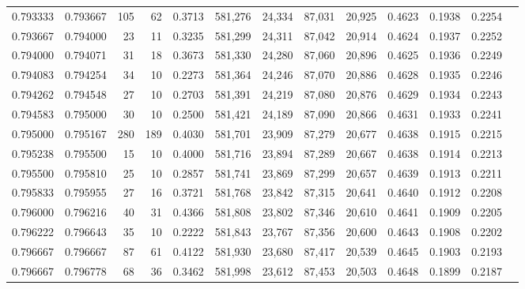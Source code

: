 \begin{tabular}{rrrrrrrrrrrrr}
0.793333 & 0.793667 &   105 &  62 &                                     0.3713 & 581,276 &  24,334 &  87,031 &  20,925 & 0.4623 & 0.1938 & 0.2254 \\
0.793667 & 0.794000 &    23 &  11 &                                     0.3235 & 581,299 &  24,311 &  87,042 &  20,914 & 0.4624 & 0.1937 & 0.2252 \\
0.794000 & 0.794071 &    31 &  18 &                                     0.3673 & 581,330 &  24,280 &  87,060 &  20,896 & 0.4625 & 0.1936 & 0.2249 \\
0.794083 & 0.794254 &    34 &  10 &                                     0.2273 & 581,364 &  24,246 &  87,070 &  20,886 & 0.4628 & 0.1935 & 0.2246 \\
0.794262 & 0.794548 &    27 &  10 &                                     0.2703 & 581,391 &  24,219 &  87,080 &  20,876 & 0.4629 & 0.1934 & 0.2243 \\
0.794583 & 0.795000 &    30 &  10 &                                     0.2500 & 581,421 &  24,189 &  87,090 &  20,866 & 0.4631 & 0.1933 & 0.2241 \\
0.795000 & 0.795167 &   280 & 189 &                                     0.4030 & 581,701 &  23,909 &  87,279 &  20,677 & 0.4638 & 0.1915 & 0.2215 \\
0.795238 & 0.795500 &    15 &  10 &                                     0.4000 & 581,716 &  23,894 &  87,289 &  20,667 & 0.4638 & 0.1914 & 0.2213 \\
0.795500 & 0.795810 &    25 &  10 &                                     0.2857 & 581,741 &  23,869 &  87,299 &  20,657 & 0.4639 & 0.1913 & 0.2211 \\
0.795833 & 0.795955 &    27 &  16 &                                     0.3721 & 581,768 &  23,842 &  87,315 &  20,641 & 0.4640 & 0.1912 & 0.2208 \\
0.796000 & 0.796216 &    40 &  31 &                                     0.4366 & 581,808 &  23,802 &  87,346 &  20,610 & 0.4641 & 0.1909 & 0.2205 \\
0.796222 & 0.796643 &    35 &  10 &                                     0.2222 & 581,843 &  23,767 &  87,356 &  20,600 & 0.4643 & 0.1908 & 0.2202 \\
0.796667 & 0.796667 &    87 &  61 &                                     0.4122 & 581,930 &  23,680 &  87,417 &  20,539 & 0.4645 & 0.1903 & 0.2193 \\
0.796667 & 0.796778 &    68 &  36 &                                     0.3462 & 581,998 &  23,612 &  87,453 &  20,503 & 0.4648 & 0.1899 & 0.2187 \\

\end{tabular}
